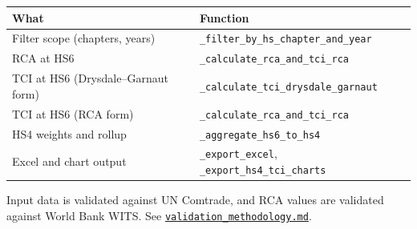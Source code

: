 \documentclass[11pt,a4paper]{article}
\begin{document}
\begin{center}\small
\begin{tabular}{ll}
\toprule
\textbf{What} & \textbf{Function} \\
\midrule
Filter scope (chapters, years)   & \texttt{\_filter\_by\_hs\_chapter\_and\_year} \\
RCA at HS6                       & \texttt{\_calculate\_rca\_and\_tci\_rca} \\
TCI at HS6 (Drysdale--Garnaut form) & \texttt{\_calculate\_tci\_drysdale\_garnaut} \\
TCI at HS6 (RCA form)            & \texttt{\_calculate\_rca\_and\_tci\_rca} \\
HS4 weights and rollup           & \texttt{\_aggregate\_hs6\_to\_hs4} \\
Excel and chart output           & \texttt{\_export\_excel}, \texttt{\_export\_hs4\_tci\_charts} \\
\bottomrule
\end{tabular}
\end{center}

Input data is validated against UN Comtrade, and RCA values are validated against World Bank WITS. See \href{validation_methodology.md}{\texttt{validation\_methodology.md}}.
\end{document}

